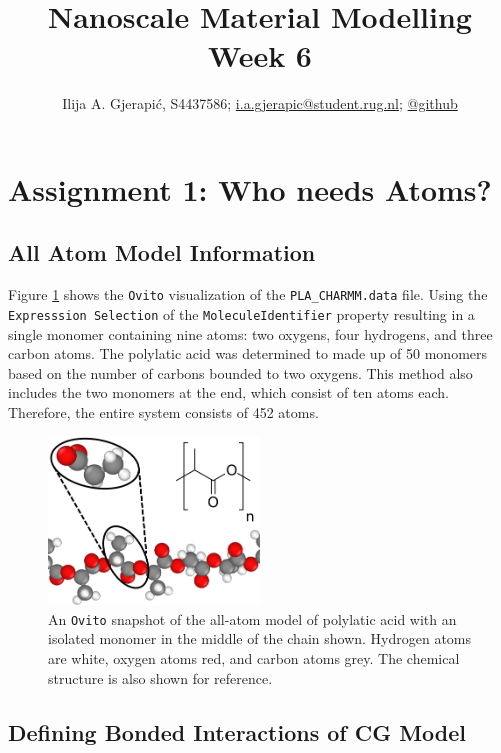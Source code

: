 \documentclass[10pt,a4paper]{labreport}
\title{Nanoscale Material Modelling
\\
\normalsize{Week 6}} %
\author{Ilija A. Gjerapić, S4437586; \href{mailto:i.a.gjerapic@student.rug.nl}{i.a.gjerapic@student.rug.nl}; \href{https://github.com/igjerapic/nmm-week1/}{@github} } %
\begin{document}
\maketitle
\tableofcontents


  

\thispagestyle{firststyle}
\newpage
\section{Assignment 1: Who needs Atoms?}
\subsection{All Atom Model Information}  
  Figure \ref{fig:ass1_PLA} shows the \texttt{Ovito} visualization of the \texttt{PLA\_CHARMM.data} file. Using the \texttt{Expresssion Selection} of the \texttt{MoleculeIdentifier} property resulting in a single monomer containing nine atoms: two oxygens, four hydrogens, and three carbon atoms. 
  The polylatic acid was determined to made up of 50 monomers based on the number of carbons bounded to two oxygens. This method also includes the two monomers at the end, which consist of ten atoms each. Therefore, the entire system consists of 452 atoms.   
  \begin{figure}[h]
    \centering 
    \includegraphics[width = 0.5\textwidth]{figs/ass1_PLA.png}
    \caption{An \texttt{Ovito} snapshot of the all-atom model of polylatic acid with an isolated monomer in the middle of the chain shown. Hydrogen atoms are white, oxygen atoms red, and carbon atoms grey. The chemical structure is also shown for reference.}
    \label{fig:ass1_PLA}
  \end{figure}

  \subsection{Defining Bonded Interactions of CG Model}
\end{document}
